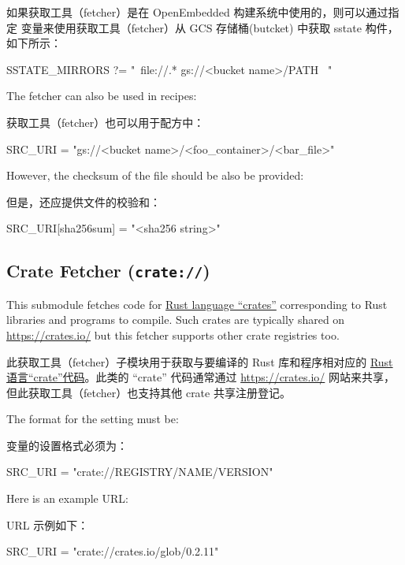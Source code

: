 如果获取工具（fetcher）是在 OpenEmbedded 构建系统中使用的，则可以通过指定  变量来使用获取工具（fetcher）从 GCS 存储桶(butcket) 中获取 sstate 构件，如下所示：

\begin{pyglist}
SSTATE_MIRRORS ?= "\
    file://.* gs://<bucket name>/PATH \
"
\end{pyglist}

The fetcher can also be used in recipes:

获取工具（fetcher）也可以用于配方中：

\begin{pyglist}
SRC_URI = "gs://<bucket name>/<foo_container>/<bar_file>"
\end{pyglist}

However, the checksum of the file should be also be provided:

但是，还应提供文件的校验和：

\begin{pyglist}
SRC_URI[sha256sum] = "<sha256 string>"
\end{pyglist}

\subsection{Crate Fetcher (\texttt{crate://})}

This submodule fetches code for \href{https://doc.rust-lang.org/reference/glossary.html?highlight=crate#crate}{Rust language ``crates''} corresponding to Rust libraries and programs to compile. Such crates are typically shared on \url{https://crates.io/} but this fetcher supports other crate registries too.

此获取工具（fetcher）子模块用于获取与要编译的 Rust 库和程序相对应的 \href{https://doc.rust-lang.org/reference/glossary.html?highlight=crate#crate}{Rust 语言“crate”代码}。此类的 ``crate'' 代码通常通过 \url{https://crates.io/} 网站来共享，但此获取工具（fetcher）也支持其他 crate 共享注册登记。

The format for the  setting must be:

\bbgls{SRC_URI} 变量的设置格式必须为：

\begin{pyglist}
SRC_URI = "crate://REGISTRY/NAME/VERSION"
\end{pyglist}

Here is an example URL:

URL 示例如下：

\begin{pyglist}
SRC_URI = "crate://crates.io/glob/0.2.11"
\end{pyglist}

